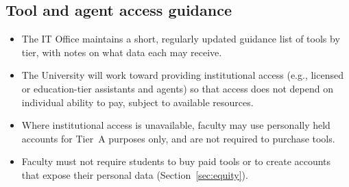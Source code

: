 \subsection{Tool and agent access guidance}
\begin{itemize}
  \item The IT Office maintains a short, regularly updated guidance list of tools by tier, with notes on what data each may receive.
  \item The University will work toward providing institutional access (e.g., licensed or education-tier assistants and agents) so that access does not depend on individual ability to pay, subject to available resources.
  \item Where institutional access is unavailable, faculty may use personally held accounts for Tier~A purposes only, and are not required to purchase tools.
  \item Faculty must not require students to buy paid tools or to create accounts that expose their personal data (Section~\ref{sec:equity}).
\end{itemize}

